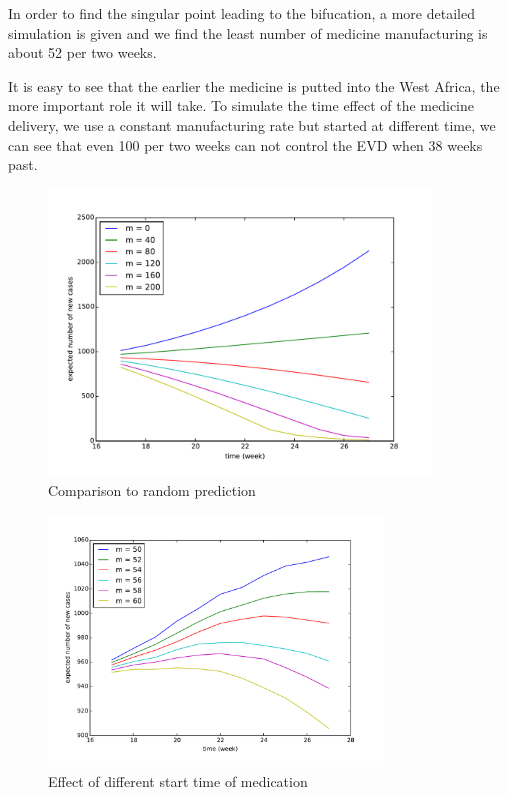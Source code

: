 \documentclass[11pt]{article}
\begin{document}
In order to find the singular point leading to the bifucation, a more detailed simulation is given and we find the least number of medicine manufacturing is about 52 per two weeks.  

It is easy to see that the earlier the medicine is putted into the West Africa, the more important role it will take. To simulate the time effect of the medicine delivery, we use a constant manufacturing rate but started at different time, we can see that even 100 per two weeks can not control the EVD when 38 weeks past.

\begin{figure}[hbtp]
\begin{center}
  \includegraphics[width=4in]{graph/good.pdf}
  \caption{Comparison to random prediction}
  \label{g1}
\end{center}  
\end{figure}

\begin{figure}[hbtp]
\begin{center}
  \includegraphics[width=3.5in]{graph/good2.pdf}
  \caption{Effect of different start time of medication}
  \label{g2}
\end{center}  
\end{figure}
\end{document}
